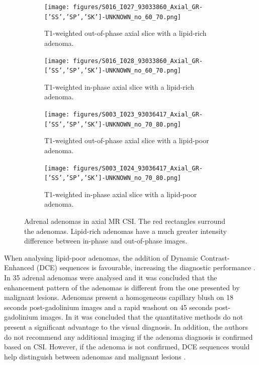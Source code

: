 \documentclass[11pt]{article}
\begin{document}
\begin{figure}
    \centering
    \begin{subfigure}[b]{0.45\textwidth}
        \centering
        \texttt{[image: figures/S016\_I027\_93033860\_Axial\_GR-['SS','SP','SK']-UNKNOWN\_no\_60\_70.png]}
        \caption{T1-weighted out-of-phase axial slice with a lipid-rich adenoma.}
        \label{fig:adenoma_lr_OP}
    \end{subfigure}
    \hfill
    \begin{subfigure}[b]{0.45\textwidth}
        \centering
        \texttt{[image: figures/S016\_I028\_93033860\_Axial\_GR-['SS','SP','SK']-UNKNOWN\_no\_60\_70.png]}
        \caption{T1-weighted in-phase axial slice with a lipid-rich adenoma.}
        \label{fig:adenoma_lr_IP}
    \end{subfigure}
    \vfill
    \begin{subfigure}[b]{0.45\textwidth}
        \centering
        \texttt{[image: figures/S003\_I023\_93036417\_Axial\_GR-['SS','SP','SK']-UNKNOWN\_no\_70\_80.png]}
        \caption{T1-weighted out-of-phase axial slice with a lipid-poor adenoma.}
        \label{fig:adenoma_lp_OP}
    \end{subfigure}
    \hfill
    \begin{subfigure}[b]{0.45\textwidth}
        \centering
        \texttt{[image: figures/S003\_I024\_93036417\_Axial\_GR-['SS','SP','SK']-UNKNOWN\_no\_70\_80.png]}
        \caption{T1-weighted in-phase axial slice with a lipid-poor adenoma.}
        \label{fig:adenoma_lp_IP}
    \end{subfigure}
    \caption{Adrenal adenomas in axial MR CSI. The red rectangles surround the adenomas. Lipid-rich adenomas have a much greater intensity difference between in-phase and out-of-phase images.   }
    \label{fig:adenomas}
\end{figure}

When analysing lipid-poor adenomas, the addition of Dynamic Contrast-Enhanced (DCE) sequences is
favourable, increasing the diagnostic performance \cite{Barat2022}. In
\cite{Chung2001} 35 adrenal adenomas were analysed and it was concluded that the
enhancement pattern of the adenomas is different from the one presented by
malignant lesions. Adenomas present a homogeneous capillary blush on 18 seconds
post-gadolinium images and a rapid washout on 45 seconds post-gadolinium images.
In \cite{Platzek2019} it was concluded that the
quantitative methods do not present a significant advantage to the visual
diagnosis. In addition, the authors do not recommend any additional imaging if
the adenoma diagnosis is confirmed based on CSI. However, if the adenoma is not
confirmed, DCE sequences would help distinguish between adenomas and
malignant lesions \cite{Platzek2019}.
\end{document}
